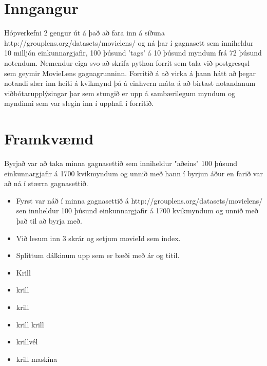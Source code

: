 \documentclass[12pt, git, final]{rureport}
\begin{document}
\maketitle  %



\section{Inngangur} %

Hópverkefni 2 gengur út á það að fara inn á síðuna http://grouplens.org/datasets/movielens/ og ná þar í gagnasett sem inniheldur 10 milljón einkunnargjafir, 100 þúsund 'tags' á 10 þúsund myndum frá 72 þúsund notendum.
\newline
Nemendur eiga svo að skrifa python forrit sem tala við postgresqsl sem geymir MovieLens gagnagrunninn. Forritið á að virka á þann hátt að þegar notandi slær inn heiti á kvikmynd þá á einhvern máta á að birtast notandanum viðbótarupplýsingar þar sem stungið er upp á sambærilegum myndum og myndinni sem var slegin inn í upphafi í forritið.
\section{Framkvæmd}
Byrjað var að taka minna gagnasettið sem inniheldur "aðeins" 100 þúsund einkunnargjafir á 1700 kvikmyndum og unnið með hann í byrjun áður en farið var að ná í stærra gagnasettið.
\begin{itemize} 
	\item Fyrst var náð í minna gagnasettið á http://grouplens.org/datasets/movielens/ sen innheldur 100 þúsund einkunnargjafir á 1700 kvikmyndum og unnið með það til að byrja með.
	\item Við lesum inn 3 skrár og setjum movieId sem index.
	\item Splittum dálkinum upp sem er bæði með ár og titil.
	\item Krill
	\item krill
	\item krill 
	\item krill krill
	\item krillvél
	\item krill maskína
\end{itemize}
 
\end{document}
